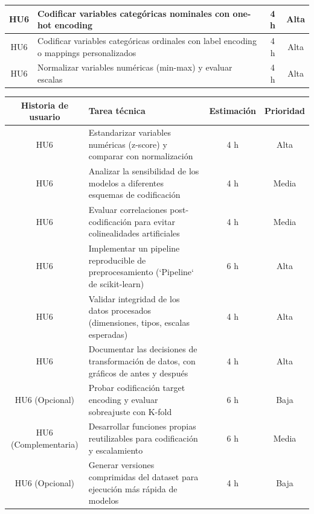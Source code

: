 \documentclass[
11pt, %
]{charter}
\begin{document}
\begin{table}[htpb]
\begin{tabularx}{\linewidth}{@{}|c|X|c|c|@{}}
HU6 & Codificar variables categóricas nominales con one-hot encoding & 4 h & Alta \\ \hline
HU6 & Codificar variables categóricas ordinales con label encoding o mappings personalizados & 4 h & Alta \\ \hline
HU6 & Normalizar variables numéricas (min-max) y evaluar escalas & 4 h & Alta \\ \hline


\end{tabularx}
\end{table}

\begin{table}[htpb]
\centering
\begin{tabularx}{\linewidth}{@{}|c|X|c|c|@{}}
\hline
\rowcolor[HTML]{C0C0C0}
Historia de usuario & Tarea técnica & Estimación & Prioridad \\ \hline

HU6 & Estandarizar variables numéricas (z-score) y comparar con normalización & 4 h & Alta \\ \hline
HU6 & Analizar la sensibilidad de los modelos a diferentes esquemas de codificación & 4 h & Media \\ \hline
HU6 & Evaluar correlaciones post-codificación para evitar colinealidades artificiales & 4 h & Media \\ \hline
HU6 & Implementar un pipeline reproducible de preprocesamiento (`Pipeline` de scikit-learn) & 6 h & Alta \\ \hline
HU6 & Validar integridad de los datos procesados (dimensiones, tipos, escalas esperadas) & 4 h & Alta \\ \hline
HU6 & Documentar las decisiones de transformación de datos, con gráficos de antes y después & 4 h & Alta \\ \hline


HU6 (Opcional) & Probar codificación target encoding y evaluar sobreajuste con K-fold & 6 h & Baja \\ \hline
HU6 (Complementaria) & Desarrollar funciones propias reutilizables para codificación y escalamiento & 6 h & Media \\ \hline
HU6 (Opcional) & Generar versiones comprimidas del dataset para ejecución más rápida de modelos & 4 h & Baja \\ \hline


\end{tabularx}
\end{table}
\end{document}
